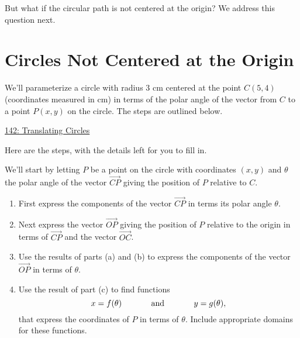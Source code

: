 \documentclass{ximera}
\begin{document}
\begin{question}  \label{Ex:sdfdsfdfL}

But what if the circular path is not centered at the origin? We address this question next.

\section{Circles Not Centered at the Origin}

We'll parameterize a circle with radius $3$ cm centered at the point $C(5,4)$ (coordinates measured in cm) in terms of the polar angle of the vector from $C$ to a point $P(x,y)$ on the circle. The steps are outlined below.

\begin{onlineOnly}
    \begin{center}
\end{center}
\end{onlineOnly}

\href{https://www.desmos.com/calculator/pcndel98wg}{142: Translating Circles}


\begin{explanation} 

Here are the steps, with the details left for you to fill in.

We'll start by letting $P$ be a point on the circle with coordinates $(x,y)$ and $\theta$ the polar angle of the vector $\overrightarrow{CP}$ giving the position of $P$ relative to $C$.

\begin{enumerate}
\item First express the components of the vector $\overrightarrow{CP}$ in terms its polar angle $\theta$.

\item Next express the vector $\overrightarrow{OP}$ giving the position of $P$ relative to the origin in terms of $\overrightarrow{CP}$ and the vector $\overrightarrow{OC}$.

\item Use the results of parts (a) and (b) to express the components of the vector $\overrightarrow{OP}$ in terms of $\theta$.

\item Use the result of part (c) to find functions
\[
    x = f(\theta)  \hskip 0.5 in \text{and} \hskip 0.5in  y=g(\theta) ,
\]
that express the coordinates of $P$ in terms of $\theta$. Include appropriate domains for these functions. 


\end{enumerate}
\end{explanation}
\end{question}
\end{document}
